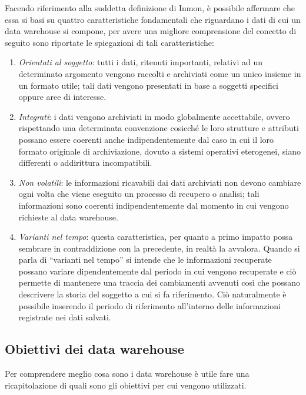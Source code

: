 Facendo riferimento alla suddetta definizione di Inmon, è possibile affermare che essa si basi su quattro caratteristiche fondamentali che riguardano i dati di cui un data warehouse si compone, per avere una migliore comprensione del concetto di seguito sono riportate le spiegazioni di tali caratteristiche:\cite{researchgate_data_warehouse_architecture}

\begin{enumerate}
    \item \textit{Orientati al soggetto}: tutti i dati, ritenuti importanti, relativi ad un determinato argomento vengono raccolti e archiviati come un unico insieme in un formato utile; tali dati vengono presentati in base a soggetti specifici oppure aree di interesse.
    \item \textit{Integrati}: i dati vengono archiviati in modo globalmente accettabile, ovvero rispettando una determinata convenzione cosicché le loro strutture e attributi possano essere coerenti anche indipendentemente dal caso in cui il loro formato originale di archiviazione, dovuto a sistemi operativi eterogenei, siano differenti o addirittura incompatibili.
    \item \textit{Non volatili}: le informazioni ricavabili dai dati archiviati non devono cambiare ogni volta che viene eseguito un processo di recupero o analisi; tali informazioni sono coerenti indipendentemente dal momento in cui vengono richieste al data warehouse.
    \item \textit{Varianti nel tempo}: questa caratteristica, per quanto a primo impatto possa sembrare in contraddizione con la precedente, in realtà la avvalora. Quando si parla di “varianti nel tempo” si intende che le informazioni recuperate possano variare dipendentemente dal periodo in cui vengono recuperate e ciò permette di mantenere una traccia dei cambiamenti avvenuti così che possano descrivere la storia del soggetto a cui si fa riferimento. Ciò naturalmente è possibile inserendo il periodo di riferimento all'interno delle informazioni registrate nei dati salvati.
\end{enumerate}

\subsection{Obiettivi dei data warehouse}
Per comprendere meglio cosa sono i data warehouse è utile fare una ricapitolazione di quali sono gli obiettivi per cui vengono utilizzati.\cite{kimball_the_data_warehouse_toolkit}

